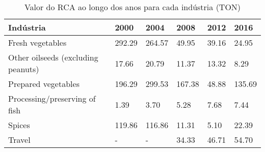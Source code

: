 \begin{table}
\centering
\caption{Valor do RCA ao longo dos anos para cada indústria (TON)}
\label{tab:ex3-tempo-TON}
\begin{tabular}{p{6cm}p{1.5cm}p{1.5cm}p{1.5cm}p{1.5cm}p{1.5cm}}
\toprule
                         Indústria &   2000 &   2004 &   2008 &  2012 &   2016 \\
\midrule
                  Fresh vegetables & 292.29 & 264.57 &  49.95 & 39.16 &  24.95 \\
Other oilseeds (excluding peanuts) &  17.66 &  20.79 &  11.37 & 13.32 &   8.29 \\
               Prepared vegetables & 196.29 & 299.53 & 167.38 & 48.88 & 135.69 \\
     Processing/preserving of fish &   1.39 &   3.70 &   5.28 &  7.68 &   7.44 \\
                            Spices & 119.86 & 116.86 &  11.31 &  5.10 &  22.39 \\
                            Travel &      - &      - &  34.33 & 46.71 &  54.70 \\
\bottomrule
\end{tabular}
\end{table}
